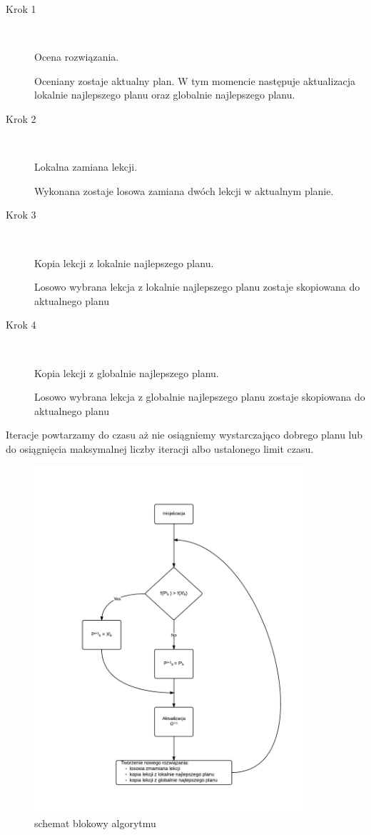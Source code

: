 \begin{description}
  \item[Krok 1] \hfill \\
     \par Ocena rozwiązania. \hfill \\
   \par Oceniany zostaje aktualny plan. W tym momencie następuje aktualizacja lokalnie najlepszego planu oraz globalnie najlepszego planu.
  \item[Krok 2] \hfill \\
     \par Lokalna zamiana lekcji. \hfill \\
    \par Wykonana zostaje losowa zamiana dwóch lekcji w aktualnym planie.

  \item[Krok 3] \hfill \\
      \par Kopia lekcji z lokalnie najlepszego planu. \hfill \\
        \par Losowo wybrana lekcja z lokalnie najlepszego planu zostaje skopiowana do aktualnego planu 
  \item[Krok 4] \hfill \\
      \par Kopia lekcji z globalnie najlepszego planu. \hfill \\
        \par Losowo wybrana lekcja z globalnie najlepszego planu zostaje skopiowana do aktualnego planu 
\end{description}
\par Iteracje powtarzamy do czasu aż nie osiągniemy wystarczająco dobrego planu lub do osiągnięcia maksymalnej liczby iteracji albo ustalonego limit czasu.
\begin{figure}[H]
\includegraphics[width=10cm]{img/schemat_pso.png}
\centering
\caption{schemat blokowy algorytmu}
\end{figure}
